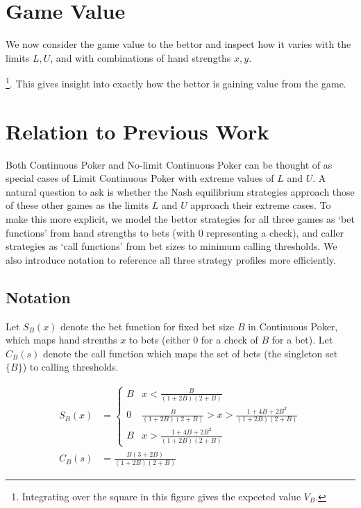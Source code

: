 \documentclass[a4paper,12pt]{article}
\theoremstyle{plain}
\theoremstyle{definition}
\begin{document}
\section{Game Value}

We now consider the game value to the bettor and inspect how it varies with the limits $L, U$, and with combinations of hand strengths $x, y$. 

\footnote{Integrating over the square in this figure gives the expected value $V_B$.}. This gives insight into exactly how the bettor is gaining value from the game. 


\section{Relation to Previous Work}

Both Continuous Poker and No-limit Continuous Poker can be thought of as special cases of Limit Continuous Poker with extreme values of $L$ and $U$. A natural question to ask is whether the Nash equilibrium strategies approach those of these other games as the limits $L$ and $U$ approach their extreme cases. To make this more explicit, we model the bettor strategies for all three games as ‘bet functions’ from hand strengths to bets (with 0 representing a check), and caller strategies as ‘call functions’ from bet sizes to minimum calling thresholds. We also introduce notation to reference all three strategy profiles more efficiently.

\subsection{Notation}

Let $S_B(x)$ denote the bet function for fixed bet size $B$ in Continuous Poker, which maps hand strenths $x$ to bets (either $0$ for a check of $B$ for a bet). Let $C_B(s)$ denote the call function which maps the set of bets (the singleton set $\{B\}$) to calling thresholds. 

\begin{align}
	S_B(x) & = \begin{cases}
    B & x < \frac{B}{(1+2B)(2+B)}\\
    0 & \frac{B}{(1+2B)(2+B)} > x > \frac{1 + 4B + 2B^2}{(1+2B)(2+B)}\\
    B & x > \frac{1 + 4B + 2B^2}{(1+2B)(2+B)}
\end{cases} \\
C_B(s) & = \frac{B(3 +2B)}{(1+2B)(2+B)}
\end{align}
\end{document}
